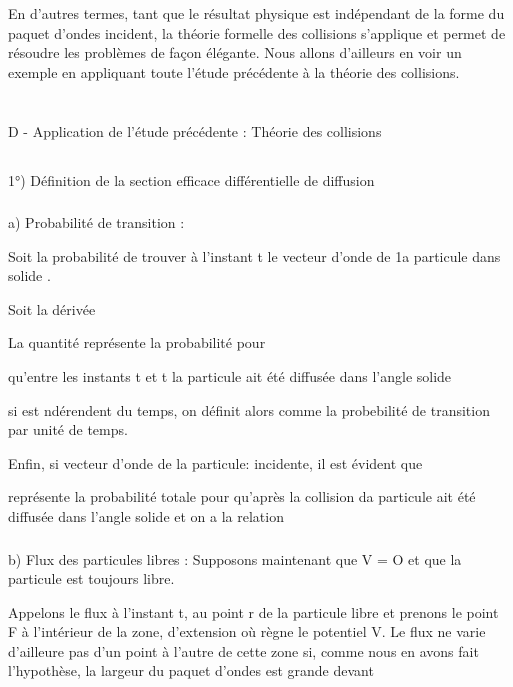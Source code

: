 En d'autres termes, tant que le résultat physique est indépendant de la
forme du paquet d'ondes incident, la théorie formelle des collisions
s'applique et permet de résoudre les problèmes de façon élégante. Nous
allons d'ailleurs en voir un exemple en appliquant toute l'étude précédente à la
théorie des collisions.

\section{}%
D - Application de l'étude précédente : Théorie des collisions
\subsection{}%
1°) Définition de la section efficace différentielle de diffusion

\subsubsection{}%
a) Probabilité de transition :

Soit  la probabilité de trouver à l'instant t le
vecteur d'onde de 1a particule dans  solide .

Soit  la dérivée 

La quantité  représente la probabilité pour

qu'entre les instants t et t  la particule ait été diffusée dans
l'angle solide 

si  est ndérendent du temps, on définit alors 
comme la probebilité  de transition par unité de temps.

Enfin, si  vecteur d'onde de la particule: incidente, il
est évident que 

 représente la probabilité totale pour qu'après
la collision da particule ait été diffusée dans l'angle solide 
et on a la relation


\subsubsection{}%
b) Flux des particules libres :
Supposons maintenant que V = O et que la particule est
toujours libre.

 Appelons le flux à l'instant t, au point r de la
particule libre et prenons le point F à l'intérieur de la zone, d'extension
où règne le potentiel V. Le flux  ne varie d'ailleure pas
d'un point à l'autre de cette zone si, comme nous en avons fait l'hypothèse,
la largeur du paquet d'ondes est grande devant

